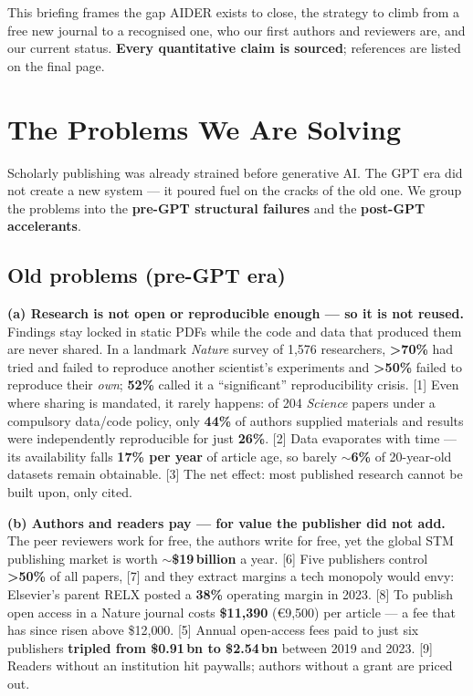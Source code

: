 \documentclass[11pt]{article}
\newcommand{\stat}[1]{{\sffamily\bfseries\color{accent}#1}}
\newcommand{\src}[1]{{\footnotesize\color{ink3}[#1]}}
\begin{document}
\clearpage

{\small\color{ink2} This briefing frames the gap AIDER exists to close, the strategy to climb from a free new journal to a recognised one, who our first authors and reviewers are, and our current status. \textbf{Every quantitative claim is sourced}; references are listed on the final page.}

\section{The Problems We Are Solving}

Scholarly publishing was already strained before generative AI. The GPT era did not create a new system --- it poured fuel on the cracks of the old one. We group the problems into the \textbf{pre-GPT structural failures} and the \textbf{post-GPT accelerants}.

\subsection{Old problems (pre-GPT era)}

\textbf{(a) Research is not open or reproducible enough --- so it is not reused.}
Findings stay locked in static PDFs while the code and data that produced them are never shared. In a landmark \emph{Nature} survey of 1{,}576 researchers, \stat{>70\%} had tried and failed to reproduce another scientist's experiments and \stat{>50\%} failed to reproduce their \emph{own}; \stat{52\%} called it a ``significant'' reproducibility crisis. \src{1} Even where sharing is mandated, it rarely happens: of 204 \emph{Science} papers under a compulsory data/code policy, only \stat{44\%} of authors supplied materials and results were independently reproducible for just \stat{26\%}. \src{2} Data evaporates with time --- its availability falls \stat{17\% per year} of article age, so barely \stat{$\sim$6\%} of 20-year-old datasets remain obtainable. \src{3} The net effect: most published research cannot be built upon, only cited.

\textbf{(b) Authors and readers pay --- for value the publisher did not add.}
The peer reviewers work for free, the authors write for free, yet the global STM publishing market is worth \stat{$\sim$\$19\,billion} a year. \src{6} Five publishers control \stat{>50\%} of all papers, \src{7} and they extract margins a tech monopoly would envy: Elsevier's parent RELX posted a \stat{38\%} operating margin in 2023. \src{8} To publish open access in a Nature journal costs \stat{\$11{,}390} (\euro9{,}500) per article --- a fee that has since risen above \$12{,}000. \src{5} Annual open-access fees paid to just six publishers \stat{tripled from \$0.91\,bn to \$2.54\,bn} between 2019 and 2023. \src{9} Readers without an institution hit paywalls; authors without a grant are priced out.
\end{document}
